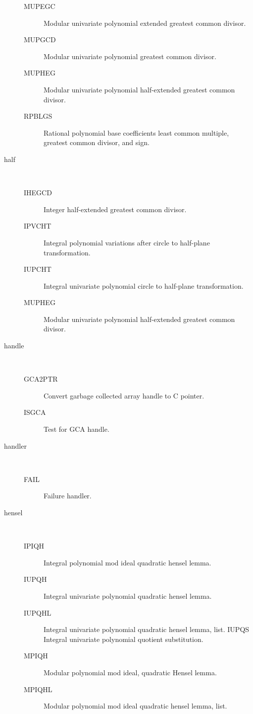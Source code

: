 \begin{description}
\begin{description}
  \item[MUPEGC]  Modular univariate polynomial extended greatest common
    divisor.
  \item[MUPGCD]  Modular univariate polynomial greatest common divisor.
  \item[MUPHEG]  Modular univariate polynomial half-extended greatest common
    divisor.
  \item[RPBLGS]  Rational polynomial base coefficients least common multiple,
    greatest common divisor, and sign.
  \end{description}
\item[half] \ \ 
  \begin{description}
  \item[IHEGCD]  Integer half-extended greatest common divisor.
  \item[IPVCHT]  Integral polynomial variations after circle to half-plane
    transformation.
  \item[IUPCHT]  Integral univariate polynomial circle to half-plane
    transformation.
  \item[MUPHEG]  Modular univariate polynomial half-extended greatest common
    divisor.
  \end{description}
\item[handle] \ \ 
  \begin{description}
  \item[GCA2PTR]  Convert garbage collected array handle to C pointer.
  \item[ISGCA]  Test for GCA handle.
  \end{description}
\item[handler] \ \ 
  \begin{description}
  \item[FAIL]  Failure handler.
  \end{description}
\item[hensel] \ \ 
  \begin{description}
  \item[IPIQH]  Integral polynomial mod ideal quadratic hensel lemma.
  \item[IUPQH]  Integral univariate polynomial quadratic hensel lemma.
  \item[IUPQHL]  Integral univariate polynomial quadratic hensel lemma, list.
    IUPQS Integral univariate polynomial quotient substitution.
  \item[MPIQH]  Modular polynomial mod ideal, quadratic Hensel lemma.
  \item[MPIQHL]  Modular polynomial mod ideal quadratic hensel lemma, list.

\end{description}
\end{description}
